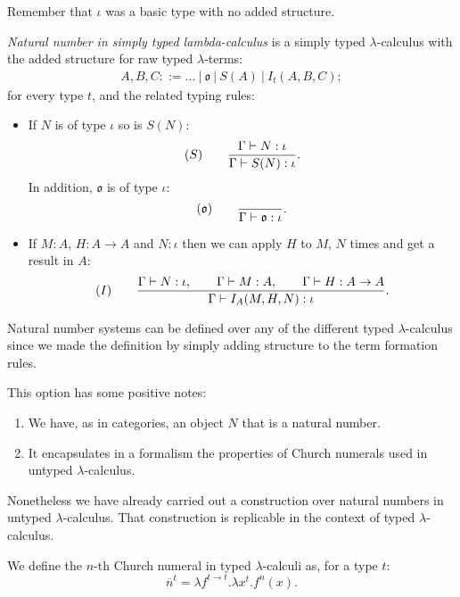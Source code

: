 \begin{remark}
  Remember that $\iota$ was a basic type with no added structure.
\end{remark}
\begin{definition}
  \emph{Natural number in simply typed lambda-calculus} is a simply typed $\lambda$-calculus with the added structure for raw typed $\lambda$-terms:
  \begin{align*}
    A,B, C ::= ...\ |\ \mathfrak{o}\ |\ S(A)\ |\ I_t(A,B,C);
  \end{align*}
  for every type $t$, and the related typing rules:
  \begin{itemize}
  \item If $N$ is of type $\iota$ so is $S(N)$:
    $$  (S)\qquad  {\displaystyle\Gamma \vdash N:\iota \over \Gamma \vdash S(N):\iota}.$$
    In addition, $\mathfrak{o}$ is of type $\iota$:
    $$  (\mathfrak{o})\qquad  {\displaystyle\over \Gamma \vdash \mathfrak{o}:\iota}.$$
  \item If $M: A$, $H: A\to A$ and $N : \iota$ then we can apply $H$ to $M$, $N$ times and get a result in $A$:
    $$  (I)\qquad  {\displaystyle\Gamma \vdash N:\iota, \qquad \Gamma \vdash M:A,\qquad \Gamma \vdash H:A\to A \over \Gamma \vdash I_A(M,H,N):\iota}.$$
  \end{itemize}
\end{definition}

\begin{remark} \label{remark-natural-numbers}
  Natural number systems can be defined over any of the different typed $\lambda$-calculus since we made the definition by simply adding structure to the term formation rules.
\end{remark}

This option has some positive notes:
\begin{enumerate}
\item We have, as in categories, an object $N$ that is a natural number.
\item It encapsulates in a formalism the properties of Church numerals used in untyped $\lambda$-calculus.
\end{enumerate}

Nonetheless we have already carried out a construction over natural numbers in untyped $\lambda$-calculus. That construction is replicable in the context of typed $\lambda$-calculus.

\begin{definition}
 We define the $n$-th Church numeral in typed $\lambda$-calculi as, for a type $t$:
  $$\overline n^t = \lambda f^{t \to t}. \lambda x^{t}. f^{n}(x).$$
  
\end{definition}

